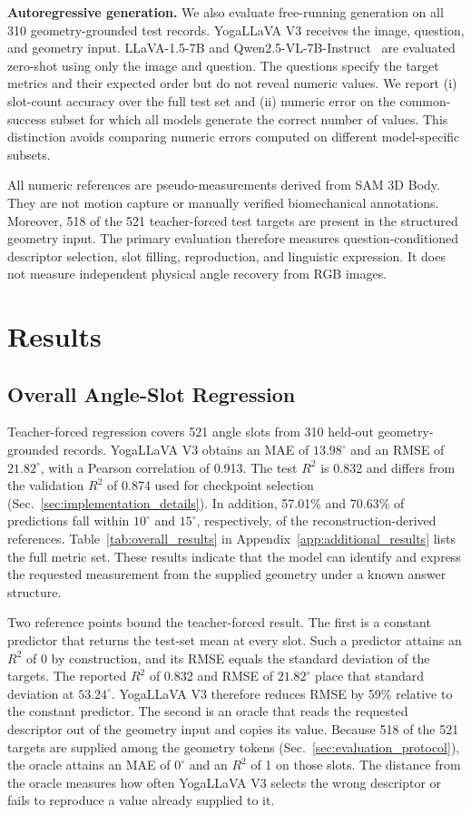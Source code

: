 \documentclass[conference]{IEEEtran}
\begin{document}
\noindent\textbf{Autoregressive generation.}
We also evaluate free-running generation on all 310 geometry-grounded test records.
YogaLLaVA V3 receives the image, question, and geometry input.
LLaVA-1.5-7B and Qwen2.5-VL-7B-Instruct~\cite{bai2025qwen25vl} are evaluated zero-shot using only the image and question.
The questions specify the target metrics and their expected order but do not reveal numeric values.
We report (i) slot-count accuracy over the full test set and (ii) numeric error on the common-success subset for which all models generate the correct number of values.
This distinction avoids comparing numeric errors computed on different model-specific subsets.

All numeric references are pseudo-measurements derived from SAM 3D Body.
They are not motion capture or manually verified biomechanical annotations.
Moreover, 518 of the 521 teacher-forced test targets are present in the structured geometry input.
The primary evaluation therefore measures question-conditioned descriptor selection, slot filling, reproduction, and linguistic expression.
It does not measure independent physical angle recovery from RGB images.
\section{Results}
\label{sec:results}

\subsection{Overall Angle-Slot Regression}
\label{sec:overall_results}

Teacher-forced regression covers 521 angle slots from 310 held-out geometry-grounded records.
YogaLLaVA V3 obtains an MAE of $13.98^\circ$ and an RMSE of $21.82^\circ$, with a Pearson correlation of 0.913.
The test $R^2$ is 0.832 and differs from the validation $R^2$ of 0.874 used for checkpoint selection (Sec.~\ref{sec:implementation_details}).
In addition, 57.01\% and 70.63\% of predictions fall within $10^\circ$ and $15^\circ$, respectively, of the reconstruction-derived references.
Table~\ref{tab:overall_results} in Appendix~\ref{app:additional_results} lists the full metric set.
These results indicate that the model can identify and express the requested measurement from the supplied geometry under a known answer structure.

Two reference points bound the teacher-forced result.
The first is a constant predictor that returns the test-set mean at every slot.
Such a predictor attains an $R^2$ of 0 by construction, and its RMSE equals the standard deviation of the targets.
The reported $R^2$ of 0.832 and RMSE of $21.82^\circ$ place that standard deviation at $53.24^\circ$.
YogaLLaVA V3 therefore reduces RMSE by 59\% relative to the constant predictor.
The second is an oracle that reads the requested descriptor out of the geometry input and copies its value.
Because 518 of the 521 targets are supplied among the geometry tokens (Sec.~\ref{sec:evaluation_protocol}), the oracle attains an MAE of $0^\circ$ and an $R^2$ of 1 on those slots.
The distance from the oracle measures how often YogaLLaVA V3 selects the wrong descriptor or fails to reproduce a value already supplied to it.
\end{document}
